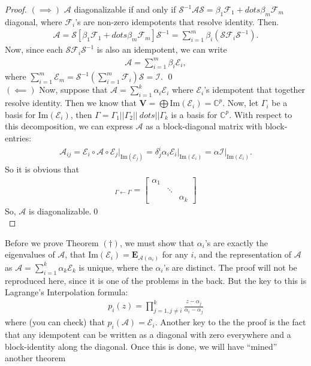 \documentclass{book}
\theoremstyle{definition}
\newcommand{\F}{\mathcal{F}}
\newcommand{\C}{\mathbb{C}}
\newcommand{\V}{\mathbf{V}}
\newcommand{\A}{\mathcal{A}}
\newcommand{\E}{\mathcal{E}}
\newcommand{\ima}{\text{Im}}
\newcommand{\s}{\mathcal{S}}
\newcommand{\lp}{\left(}
\newcommand{\rp}{\right)}
\newcommand{\lb}{\left[}
\newcommand{\rb}{\right]}
\begin{document}
\begin{proof}
	$(\implies)$ $\A$ diagonalizable if and only if $\s^{-1}\A\s = \beta_1\F_1 + dots \beta_m\F_m$ diagonal, where $\F_i$'s are non-zero idempotents that resolve identity. Then.
	\begin{align*}
	\A = \s \lb \beta_1\F_1 + dots \beta_m\F_m \rb \s^{-1} = \sum^{m}_{i=1}\beta_i (\s\F_i\s^{-1}).
	\end{align*} 
	Now, since each $\s\F_i\s^{-1}$ is also an idempotent, we can write
	\begin{align*}
	\A = \sum^{m}_{i=1}\beta_i\E_i,
	\end{align*}
	where $\sum^m_{i=1}\E_m = \s^{-1}\lp\sum^m_{i=1}\F_i \rp\s = \mathcal{I}$. \qed\\
	
	
	$(\impliedby)$ Now, suppose that $\A = \sum^k_{i=1}\alpha_i\E_i$ where $\E_i$'s idempotent that together resolve identity. Then we know that $\V = \bigoplus \ima(\E_i) = \mathbb{C}^p$. Now, let $\Gamma_i$ be a basis for $\ima(\E_i)$, then $\Gamma = \Gamma_1 \vert\vert \Gamma_2 \vert\vert\ dots \vert\vert\Gamma_k$ is a basis for $\C^p$. With respect to this decomposition, we can express $\A$ as a block-diagonal matrix with block-entries:
	\begin{align*}
	\A_{ij} = \E_i \circ \A \circ \E_j\bigg\vert_{\ima(\E_j)} = \delta^i_j \alpha_i\E_i\bigg\vert_{\ima(\E_i)} = \alpha \mathcal{I}\bigg\vert_{\ima(\E_i)}.
	\end{align*}
	So it is obvious that
	\begin{align*}
	[\A]_{\Gamma\leftarrow\Gamma} = \begin{bmatrix}
	\alpha_1 & & \\
	& \ddots & \\
	& & \alpha_k
	\end{bmatrix}
	\end{align*}
	So, $\A$ is diagonalizable.\qed  \\
\end{proof}

Before we prove Theorem $(\dagger)$, we must show that $\alpha_i$'s are exactly the eigenvalues of $\A$, that $\ima(\E_i) = \mathbf{E}_{\A(\alpha_i)}$ for any $i$, and the representation of $\A$ as $\A = \sum^k_{i=1}\alpha_k\E_k$ is unique, where the $\alpha_i$'s are distinct. The proof will not be reproduced here, since it is one of the problems in the back. But the key to this is Lagrange's Interpolation formula:
\begin{align*}
p_i(z) = \prod^k_{j=1, j\neq i} \frac{z - \alpha_j}{\alpha_i - \alpha_j}
\end{align*} 
where (you can check) that $p_i(\A) = \E_i$. Another key to the the proof is the fact that any idempotent can be written as a diagonal with zero everywhere and a block-identity along the diagonal. Once this is done, we will have ``mined'' another theorem
\end{document}
